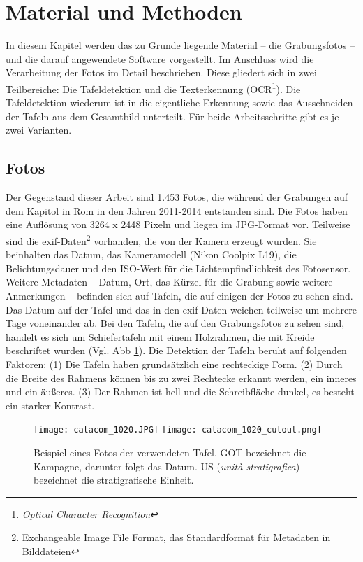 \section{Material und Methoden}

In diesem Kapitel werden das zu Grunde liegende Material -- die Grabungsfotos -- und die darauf angewendete Software vorgestellt. Im Anschluss wird die Verarbeitung der Fotos im Detail beschrieben. 
Diese gliedert sich in zwei Teilbereiche: Die Tafeldetektion und die Texterkennung (OCR\footnote{\textit{Optical Character Recognition}}). Die Tafeldetektion wiederum ist in die eigentliche Erkennung sowie das Ausschneiden der Tafeln aus dem Gesamtbild unterteilt. Für beide Arbeitsschritte gibt es je zwei Varianten.
\subsection{Fotos}
Der Gegenstand dieser Arbeit sind 1.453 Fotos, die während der Grabungen auf dem Kapitol in Rom in den Jahren 2011-2014 entstanden sind. Die Fotos haben eine Auflösung von 3264 x 2448 Pixeln und liegen im JPG-Format vor. Teilweise sind die exif-Daten\footnote{Exchangeable Image File Format, das Standardformat für Metadaten in Bilddateien\cite{exif}} vorhanden, die von der Kamera erzeugt wurden. Sie beinhalten das Datum, das Kameramodell (Nikon Coolpix L19), die Belichtungsdauer und den ISO-Wert für die Lichtempfindlichkeit des Fotosensor. Weitere Metadaten -- Datum, Ort, das Kürzel für die Grabung sowie weitere Anmerkungen -- befinden sich auf Tafeln, die auf einigen der Fotos zu sehen sind. Das Datum auf der Tafel und das in den exif-Daten weichen teilweise um mehrere Tage voneinander ab.
Bei den Tafeln, die auf den Grabungsfotos zu sehen sind, handelt es sich um Schiefertafeln mit einem Holzrahmen, die mit Kreide beschriftet wurden (Vgl. Abb \ref{fig:einfachetafel}). Die Detektion der Tafeln beruht auf folgenden Faktoren: (1) Die Tafeln haben grundsätzlich eine rechteckige Form. (2) Durch die Breite des Rahmens können bis zu zwei Rechtecke erkannt werden, ein inneres und ein äußeres. (3) Der Rahmen ist hell und die Schreibfläche dunkel, es besteht ein starker Kontrast.
\begin{figure}[!h]
\texttt{[image: catacom\_1020.JPG]}
\texttt{[image: catacom\_1020\_cutout.png]}
\caption{Beispiel eines Fotos der verwendeten Tafel. GOT bezeichnet die Kampagne, darunter folgt das Datum. US (\textit{unità stratigrafica}) bezeichnet die stratigrafische Einheit.}
\label{fig:einfachetafel}
\end{figure}
